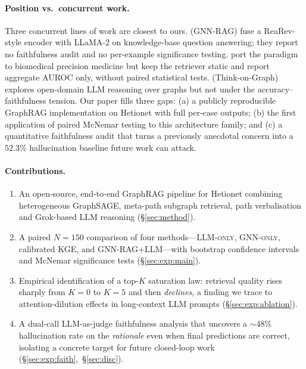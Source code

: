 \documentclass{article}
\newcommand{\ours}{\textsc{GNN-RAG+LLM}\xspace}
\newcommand{\gnno}{\textsc{GNN-only}\xspace}
\newcommand{\llmo}{\textsc{LLM-only}\xspace}
\newcommand{\kge}{\textsc{KGE}\xspace}
\begin{document}
\paragraph{Position vs.\ concurrent work.}
Three concurrent lines of work are closest to ours. \citet{mavromatis2024gnnrag} (GNN-RAG) fuse a ReaRev-style encoder with LLaMA-2 on knowledge-base question answering; they report no faithfulness audit and no per-example significance testing. \citet{hays2026raggnn} port the paradigm to biomedical precision medicine but keep the retriever static and report aggregate AUROC only, without paired statistical tests. \citet{sun2024tog} (Think-on-Graph) explores open-domain LLM reasoning over graphs but not under the accuracy--faithfulness tension. Our paper fills three gaps: (a) a publicly reproducible GraphRAG implementation on Hetionet with full per-case outputs; (b) the first application of paired McNemar testing to this architecture family; and (c) a quantitative faithfulness audit that turns a previously anecdotal concern into a $52.3\%$ hallucination baseline future work can attack.

\paragraph{Contributions.}
\begin{enumerate}[label=(\roman*)]
    \item An open-source, end-to-end GraphRAG pipeline for Hetionet combining heterogeneous GraphSAGE, meta-path subgraph retrieval, path verbalisation and Grok-based LLM reasoning (\S\ref{sec:method}).
    \item A paired $N{=}150$ comparison of four methods---\llmo, \gnno, calibrated \kge, and \ours---with bootstrap confidence intervals and McNemar significance tests (\S\ref{sec:exp:main}).
    \item Empirical identification of a top-$K$ saturation law: retrieval quality rises sharply from $K{=}0$ to $K{=}5$ and then \emph{declines}, a finding we trace to attention-dilution effects in long-context LLM prompts (\S\ref{sec:exp:ablation}).
    \item A dual-call LLM-as-judge faithfulness analysis that uncovers a $\sim$48\% hallucination rate on the \emph{rationale} even when final predictions are correct, isolating a concrete target for future closed-loop work (\S\ref{sec:exp:faith},~\S\ref{sec:disc}).
\end{enumerate}

\end{document}
